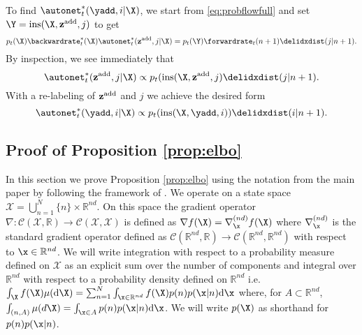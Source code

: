 To find $\autonet_t^*(\yadd, i | \X)$, we start from \eqref{eq:probflowfull} and set $\Y = \text{ins}(\X, \zadd, j)$ to get
\begin{equation}
    p_t(\X) \backwardrate_t^*(\X) \autonet_t^*(\zadd, j | \X) = p_t(\Y) \forwardrate_t(n+1) \delidxdist(j | n+1) .
\end{equation}
By inspection, we see immediately that
\begin{equation}
    \autonet_t^*(\zadd, j | \X) \propto p_t(\text{ins}(\X, \zadd, j) \delidxdist(j | n+1) . 
\end{equation}
With a re-labeling of $\mathbf{z}^{\text{add}}$ and $j$ we achieve the desired form
\begin{equation}
    \autonet_t^*(\yadd, i | \X) \propto p_t(\text{ins}(\X, \yadd, i)) \delidxdist(i | n+1) .
\end{equation}

\subsection{Proof of Proposition \ref{prop:elbo}}
\label{sec:tddm-proof_elbo}

\newcommand{\adjointK}{\hat{\mathcal{K}}^*}
\newcommand{\K}{\hat{\mathcal{K}}}
\newcommand{\mrate}{\lambda^M}
\newcommand{\mdrift}{\mathbf{b}^M}
\newcommand{\inty}{\sum_{m=1}^N \int_{\y \in \mathbb{R}^{md}}}
\newcommand{\intyNont}{\sum_{m=1 \backslash n_t}^N \int_{\y \in \mathbb{R}^{md}}}
\newcommand{\intx}{\sum_{n=1}^N \int_{\x \in \mathbb{R}^{nd}}}
\newcommand{\mtk}{K^{M}}
\newcommand{\Ldiff}{ \hat{\mathcal{L}}^{\text{diff}}  }
\newcommand{\LJ}{\hat{\mathcal{L}}^{\text{J}} }
\newcommand{\aLJ}{\hat{\mathcal{L}}^{\text{J}*  } }

In this section we prove Proposition \ref{prop:elbo} using the notation from the main paper by following the framework of \cite{benton2022denoising}.  We operate on a state
space $\mathcal{X} = \bigcup_{n=1}^N \{n\} \times \mathbb{R}^{nd}$.  On this
space the gradient operator
$\nabla: \mathcal{C}(\mathcal{X}, \mathbb{R}) \rightarrow
\mathcal{C}(\mathcal{X}, \mathcal{X})$ is defined as
$\nabla f(\X) = \nabla^{(nd)}_{\x} f(\X)$ where $\nabla^{(nd)}_{\x}$ is the
standard gradient operator defined as
$\mathcal{C}(\mathbb{R}^{nd}, \mathbb{R}) \rightarrow
\mathcal{C}(\mathbb{R}^{nd}, \mathbb{R}^{nd})$ with respect to
$\x \in \mathbb{R}^{nd}$. We will write integration with respect to a
probability measure defined on $\mathcal{X}$ as an explicit sum over the number
of components and integral over $\mathbb{R}^{nd}$ with respect to a probability
density defined on $\mathbb{R}^{nd}$ i.e.
$\int_{\X} f(\X) \mu(\rmd \X) = \sum_{n=1}^N \int_{\x \in \mathbb{R}^{nd}} f(\X)
p(n)p(\x | n) \rmd \x $ where, for $A \subset \mathbb{R}^{nd}$,
$\int_{(n, A)} \mu(d\X) = \int_{\x \in A} p(n)p(\x | n) \rmd \x$. We will write
$p(\X)$ as shorthand for $p(n)p(\x | n)$.

